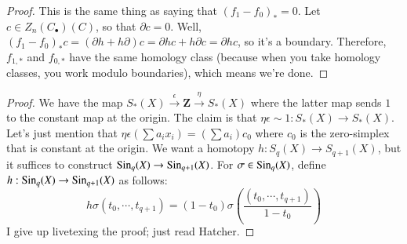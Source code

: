 		\begin{proof}
		This is the same thing as saying that $(f_1-f_0)_\ast=0$. Let $c\in Z_n(C_\bullet)(C)$, so that $\partial c=0$. Well, $(f_1-f_0)_\ast c=(\partial h+h\partial)c=\partial hc+h\partial c=\partial hc$, so it's a boundary. Therefore, $f_{1,\ast}$ and $f_{0,\ast}$ have the same homology class (because when you take homology classes, you work modulo boundaries), which means we're done.
		\end{proof}
		\begin{proof}
		We have the map $S_\ast(X)\xrightarrow{\epsilon}\mathbf{Z}\xrightarrow{\eta}S_\ast(X)$ where the latter map sends $1$ to the constant map at the origin. The claim is that $\eta\epsilon\sim 1:S_\ast(X)\to S_\ast(X)$. Let's just mention that $\eta\epsilon(\sum a_ix_i)=(\sum a_i)c_0$ where $c_0$ is the zero-simplex that is constant at the origin. We want a homotopy $h:S_q(X)\to S_{q+1}(X)$, but it suffices to construct $\mathrm{Sin}_q(X)\to \mathrm{Sin}_{q+1}(X)$. For $\sigma\in\mathrm{Sin}_q(X)$, define $h:\mathrm{Sin}_q(X)\to\mathrm{Sin}_{q+1}(X)$ as follows:
		$$h\sigma(t_0,\cdots,t_{q+1})=(1-t_0)\sigma\left(\frac{(t_0,\cdots,t_{q+1})}{1-t_0}\right)$$
		I give up livetexing the proof; just read Hatcher.
		\end{proof}
